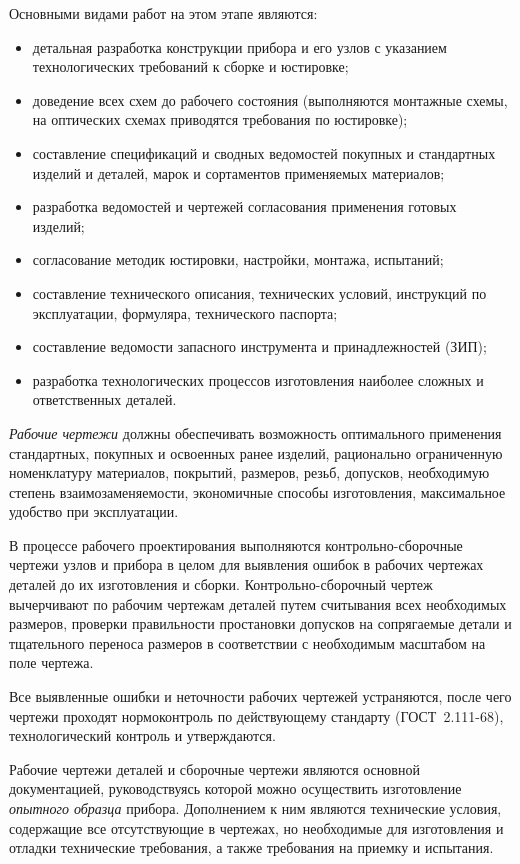 Основными видами работ на этом этапе являются:
\begin{itemize}
	\item детальная разработка конструкции прибора и его узлов с указанием технологических требований к сборке и юстировке;
	\item доведение всех схем до рабочего состояния (выполняются монтажные схемы, на оптических схемах приводятся требования по юстировке);
	\item составление спецификаций и сводных ведомостей покупных и стандартных изделий и деталей, марок и сортаментов применяемых материалов;
	\item разработка ведомостей и чертежей согласования применения готовых изделий;
	\item согласование методик юстировки, настройки, монтажа, испытаний;
	\item составление технического описания, технических условий, инструкций по эксплуатации, формуляра, технического паспорта;
	\item составление ведомости запасного инструмента и принадлежностей (ЗИП);
	\item разработка технологических процессов изготовления наиболее сложных и ответственных деталей.
\end{itemize}

\textit{Рабочие чертежи} должны обеспечивать возможность оптимального применения стандартных, покупных и освоенных ранее изделий, рационально ограниченную номенклатуру материалов, покрытий, размеров, резьб, допусков, необходимую степень взаимозаменяемости, экономичные способы изготовления, максимальное удобство при эксплуатации.

В процессе рабочего проектирования выполняются контрольно-сборочные чертежи узлов и прибора в целом для выявления ошибок в рабочих чертежах деталей до их изготовления и сборки. Контрольно-сборочный чертеж вычерчивают по рабочим чертежам деталей путем считывания всех необходимых размеров, проверки правильности простановки допусков на сопрягаемые детали и тщательного переноса размеров в соответствии с необходимым масштабом на поле чертежа.

Все выявленные ошибки и неточности рабочих чертежей устраняются, после чего чертежи проходят нормоконтроль по действующему стандарту (ГОСТ~2.111-68), технологический контроль и утверждаются.

Рабочие чертежи деталей и сборочные чертежи являются основной документацией, руководствуясь которой можно осуществить изготовление \textit{опытного образца} прибора. Дополнением к ним являются технические условия, содержащие все отсутствующие в чертежах, но необходимые для изготовления и отладки технические требования, а также требования на приемку и испытания.

